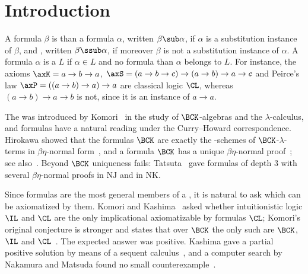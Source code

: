 \section{Introduction}\label{sec:intro}

A formula $\beta$ is  than a formula $\alpha$, written
$\beta\sub\alpha$, if $\alpha$ is a substitution instance of $\beta$, and
, written $\beta\ssub\alpha$, if moreover $\beta$
is not a substitution instance of $\alpha$. A formula $\alpha$ is
 a  $L$ if $\alpha\in L$ and no formula
 than $\alpha$ belongs to $L$. For instance, the
axioms $\axK=a\to b\to a$, $\axS=(a\to b\to c)\to(a\to b)\to a\to c$ and
Peirce's law $\axP=((a\to b)\to a)\to a$ are  classical logic
$\CL$, whereas $(a\to b)\to a\to b$ is not, since it is an instance of
$a\to a$.

The  was introduced by Komori~\cite{Kom87} in the
study of $\BCK$-algebras and the $\lambda$-calculus, and 
formulas have a natural reading under the Curry--Howard correspondence.
Hirokawa showed that the formulas  $\BCK$ are exactly the
-schemes of $\BCK$-$\lambda$-terms in $\beta\eta$-normal
form~\cite{Hir92,Hir93}, and a formula  $\BCK$ has a unique
$\beta\eta$-normal proof~\cite{Tat06}; see also~\cite{Hir91,KH93}. Beyond
$\BCK$ uniqueness fails: Tatsuta~\cite{Tat93} gave  formulas
of depth $3$ with several $\beta\eta$-normal proofs in $\mathrm{NJ}$ and in
$\mathrm{NK}$.

Since  formulas are the most general members of a , it
is natural to ask which  can be axiomatized by them. Komori and
Kashima~\cite{Kom05,Kas05} asked whether intuitionistic logic $\IL$ and
$\CL$ are the only implicational  axiomatizable by
formulas  $\CL$; Komori's original conjecture is stronger and
states that over $\BCK$ the only such  are $\BCK$, $\IL$ and
$\CL$~\cite{Kom05,Kom07}. The expected answer was positive. Kashima gave a
partial positive solution by means of a sequent calculus~\cite{Kas05}, and
a computer search by Nakamura and Matsuda found no small
counterexample~\cite[Remark~3.4]{NM21}.

